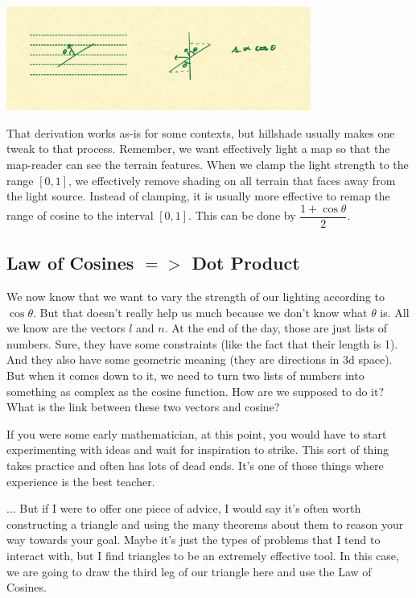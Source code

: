 \documentclass{article}
\begin{document}
\begin{center}
	\includegraphics[width=0.75\textwidth,frame]{assets/cosine.jpg}
\end{center}

That derivation works as-is for some contexts, but hillshade usually makes one tweak to that process.
Remember, we want effectively light a map so that the map-reader can see the terrain features.
When we clamp the light strength to the range $[0, 1]$, we effectively remove shading on all terrain that faces away from the light source.
Instead of clamping, it is usually more effective to remap the range of cosine to the interval $[0, 1]$.
This can be done by $\dfrac{1 + \cos \theta}{2}$.

\subsection{Law of Cosines $=>$ Dot Product}

We now know that we want to vary the strength of our lighting according to $\cos \theta$.
But that doesn't really help us much because we don't know what $\theta$ is.
All we know are the vectors $l$ and $n$.
At the end of the day, those are just lists of numbers.
Sure, they have some constraints (like the fact that their length is 1).
And they also have some geometric meaning (they are directions in 3d space).
But when it comes down to it, we need to turn two lists of numbers into something as complex as the cosine function.
How are we supposed to do it?
What is the link between these two vectors and cosine?

If you were some early mathematician, at this point, you would have to start experimenting with ideas and wait for inspiration to strike.
This sort of thing takes practice and often has lots of dead ends.
It's one of those things where experience is the best teacher.

... But if I were to offer one piece of advice, I would say it's often worth constructing a triangle and using the many theorems about them to reason your way towards your goal.
Maybe it's just the types of problems that I tend to interact with, but I find triangles to be an extremely effective tool.
In this case, we are going to draw the third leg of our triangle here and use the Law of Cosines.
\end{document}
